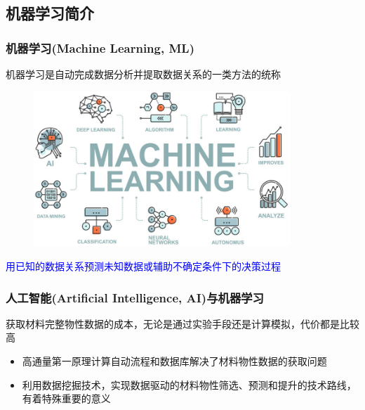 {{\subsection{机器学习简介}
\frame
{
	\frametitle{机器学习\textrm{(Machine Learning, ML)}}
机器学习是自动完成数据分析并提取数据关系的一类方法的统称
\begin{figure}[h!]
\centering
\vspace*{-0.1in}
\includegraphics[height=2.3in,width=3.8in,viewport=0 0 630 390,clip]{Figures/Machine_Learning.jpg}
\label{Machine-Learning}
\end{figure}
\textcolor{blue}{用已知的数据关系预测未知数据或辅助不确定条件下的决策过程}
}

\frame
{
	\frametitle{人工智能\textrm{(Artificial Intelligence, AI)}与机器学习}
		获取材料完整物性数据的成本，无论是通过实验手段还是计算模拟，代价都是比较高
		\begin{itemize}
			\item 高通量第一原理计算自动流程和数据库解决了材料物性数据的获取问题%
			\item 利用数据挖掘技术，实现数据驱动的材料物性筛选、预测和提升的技术路线，有着特殊重要的意义
		\end{itemize}
	\vskip 8pt
	{\fontsize{8.2pt}{6.2pt}}
}

}}
